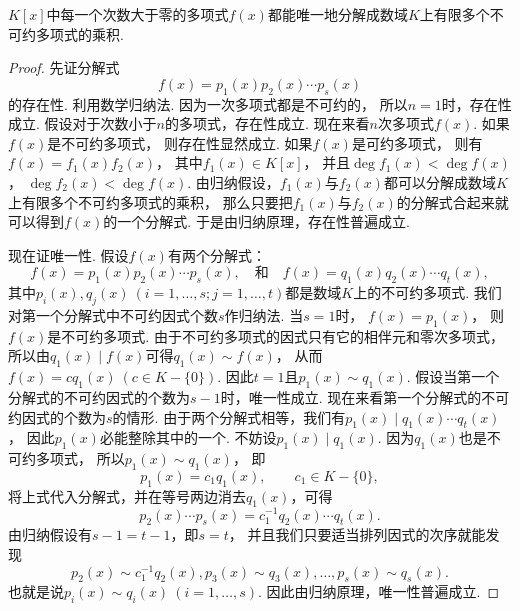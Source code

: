 \begin{theorem}[唯一因式分解定理]\label{theorem:多项式.唯一因式分解定理}
\(K[x]\)中每一个次数大于零的多项式\(f(x)\)都能唯一地分解成数域\(K\)上有限多个不可约多项式的乘积.
\begin{proof}
先证分解式\begin{equation*}
	f(x) = p_1(x) p_2(x) \dotsm p_s(x)
\end{equation*}的存在性.
利用数学归纳法.
因为一次多项式都是不可约的，
所以\(n=1\)时，存在性成立.
假设对于次数小于\(n\)的多项式，存在性成立.
现在来看\(n\)次多项式\(f(x)\).
如果\(f(x)\)是不可约多项式，
则存在性显然成立.
如果\(f(x)\)是可约多项式，
则有\(f(x)=f_1(x) f_2(x)\)，
其中\(f_1(x) \in K[x]\)，
并且\(\deg f_1(x) < \deg f(x)\)，
\(\deg f_2(x) < \deg f(x)\).
由归纳假设，\(f_1(x)\)与\(f_2(x)\)都可以分解成数域\(K\)上有限多个不可约多项式的乘积，
那么只要把\(f_1(x)\)与\(f_2(x)\)的分解式合起来就可以得到\(f(x)\)的一个分解式.
于是由归纳原理，存在性普遍成立.

现在证唯一性.
假设\(f(x)\)有两个分解式：\begin{equation*}
	f(x) = p_1(x) p_2(x) \dotsm p_s(x),
	\quad\text{和}\quad
	f(x) = q_1(x) q_2(x) \dotsm q_t(x),
\end{equation*}
其中\(p_i(x),q_j(x)\ (i=1,\dotsc,s;j=1,\dotsc,t)\)都是数域\(K\)上的不可约多项式.
我们对第一个分解式中不可约因式个数\(s\)作归纳法.
当\(s=1\)时，
\(f(x) = p_1(x)\)，
则\(f(x)\)是不可约多项式.
由于不可约多项式的因式只有它的相伴元和零次多项式，
所以由\(q_1(x) \mid f(x)\)可得\(q_1(x) \sim f(x)\)，
从而\(f(x) = c q_1(x)\ (c \in K-\{0\})\).
因此\(t=1\)且\(p_1(x) \sim q_1(x)\).
假设当第一个分解式的不可约因式的个数为\(s-1\)时，唯一性成立.
现在来看第一个分解式的不可约因式的个数为\(s\)的情形.
由于两个分解式相等，我们有\(p_1(x) \mid q_1(x) \dotsm q_t(x)\)，
因此\(p_1(x)\)必能整除其中的一个.
不妨设\(p_1(x) \mid q_1(x)\).
因为\(q_1(x)\)也是不可约多项式，
所以\(p_1(x) \sim q_1(x)\)，
即\begin{equation*}
	p_1(x) = c_1 q_1(x), \qquad
	c_1 \in K-\{0\},
\end{equation*}
将上式代入分解式，并在等号两边消去\(q_1(x)\)，可得\begin{equation*}
	p_2(x) \dotsm p_s(x) = c_1^{-1} q_2(x) \dotsm q_t(x).
\end{equation*}
由归纳假设有\(s-1=t-1\)，即\(s=t\)，
并且我们只要适当排列因式的次序就能发现\begin{equation*}
	p_2(x) \sim c_1^{-1} q_2(x),
	p_3(x) \sim q_3(x),
	\dotsc,
	p_s(x) \sim q_s(x).
\end{equation*}
也就是说\(p_i(x) \sim q_i(x)\ (i=1,\dotsc,s)\).
因此由归纳原理，唯一性普遍成立.
\end{proof}
\end{theorem}

